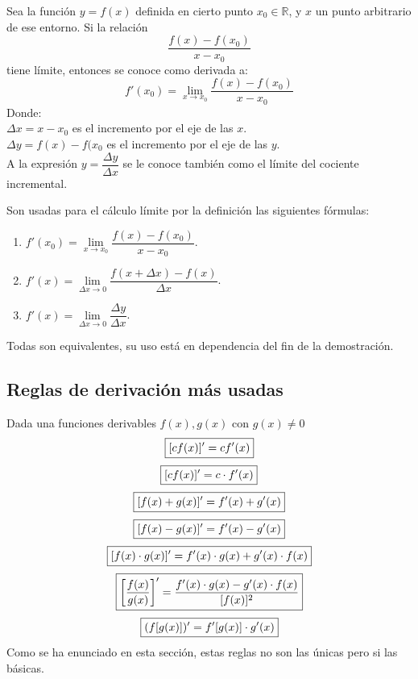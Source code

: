 \documentclass[10pt,twoside]{SelfArx} %
\begin{document}
\begin{thm}
Sea la función $ y=f(x) $ definida en cierto punto $ x_{0}\in\mathbb{R} $, y $ x $ un punto arbitrario de ese entorno. Si la relación
\[ \dfrac{f(x)-f(x_{0})}{x-x_{0}} \]
tiene límite, entonces se conoce como derivada a:
\[ f'(x_{0})=\lim\limits_{x\rightarrow x_{0}}\dfrac{f(x)-f(x_{0})}{x-x_{0}} \]
Donde:\\
$ \Delta x= x-x_{0} $ es el incremento por el eje de las $ x $.\\
$ \Delta y=f(x)-f(x_{0} $ es el incremento por el eje de las $ y $.\\

A la expresión $ y=\dfrac{\Delta y}{\Delta x} $ se le conoce también como el límite del cociente incremental.
	
\end{thm}
Son usadas para el c\'alculo límite por la definición las siguientes fórmulas:
\begin{enumerate}\label{ecuaciones_derivadas}
	\item $ f'(x_{0})=\lim\limits_{x\rightarrow x_{0}}\dfrac{f(x)-f(x_{0})}{x-x_{0}} $.
	\item $ f'(x)=\lim\limits_{\Delta x\rightarrow 0}\dfrac{f(x+\Delta x)-f(x)}{\Delta x} $.
	\item $ f'(x)=\lim\limits_{\Delta x\rightarrow 0}\dfrac{\Delta y}{\Delta x} $.
\end{enumerate}
Todas son equivalentes, su uso está en dependencia del fin de la demostración.
\subsection{Reglas de derivaci\'on más usadas}




{\fboxsep 8pt\fboxrule 1pt \label{propiedades_derivadas}
Dada una funciones derivables $ f(x), g(x) $ con $ g(x)\neq0 $
\[ \fbox{$\displaystyle[cf(x)]'=cf'(x)$} \]
\[ \fbox{$\displaystyle[cf(x)]'=c\cdot f'(x)$} \]
\[ \fbox{$\displaystyle[f(x)+g(x)]'=f'(x)+g'(x)$} \]
\[ \fbox{$\displaystyle[f(x)-g(x)]'=f'(x)-g'(x)$} \]
\[ \fbox{$\displaystyle[f(x)\cdot g(x)]'=f'(x)\cdot g(x)+g'(x)\cdot f(x)$} \]
\[ \fbox{$\displaystyle\left [\frac{f(x)}{g(x)}\right ]'=\frac{f'(x)\cdot g(x)-g'(x)\cdot f(x)}{[f(x)]^{2}}$} \]
\[ \fbox{$\displaystyle(f[g(x)])'=f'[g(x)] \cdot g'(x)$} \]}
Como se ha enunciado en esta sección, estas reglas no son las únicas pero si las básicas.
\end{document}
